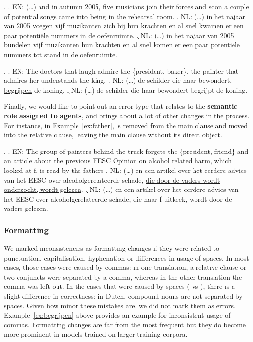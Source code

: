 \ex. \label{ex:musicians}
\a. \textsc{EN}: (\dots) and in autumn 2005, five musicians join their forces and soon a couple of potential songs came into being in the rehearsal room.
\b. \textsc{NL}: (\dots) in het najaar van 2005 voegen vijf muzikanten zich bij hun krachten en al snel kwamen er een paar potentiële nummers in de oefenruimte.
\c. \textsc{NL}: (\dots) in het najaar van 2005 bundelen vijf muzikanten hun krachten en al snel \underline{komen} er een paar potentiële nummers tot stand in de oefenruimte.


\ex. \label{ex:begrijpen}
\a. \textsc{EN}: The doctors that laugh admire the \{president, baker\}, the painter that admires her understands the king.
\b. \textsc{NL}: (\dots) de schilder die haar bewondert, \underline{begrijpen} de koning.
\c. \textsc{NL}: (\dots) de schilder die haar bewondert begrijpt de koning.

Finally, we would like to point out an error type that relates to the \textbf{semantic role assigned to agents}, and brings about a lot of other changes in the process.
For instance, in Example~\ref{ex:father},  is removed from the main clause and moved into the relative clause, leaving the main clause without its direct object.

\ex. \label{ex:father}
\a. \textsc{EN}: The group of painters behind the truck forgets the \{president, friend\} and an article about the previous EESC Opinion on alcohol related harm, which looked at f, is read by the fathers
\b. \textsc{NL}: (\dots) en een artikel over het eerdere advies van het EESC over alcoholgerelateerde schade, \underline{die door de vaders wordt onderzocht, wordt gelezen}.
\c. \textsc{NL}: (\dots) en een artikel over het eerdere advies van het EESC over alcoholgerelateerde schade, die naar f uitkeek, wordt door de vaders gelezen.

\subsubsection{Formatting}

We marked inconsistencies as formatting changes if they were related to punctuation, capitalisation, hyphenation or differences in usage of spaces. 
In most cases, those cases were caused by commas: in one translation, a relative clause or two conjuncts were separated by a comma, whereas in the other translation the comma was left out.
In the cases that were caused by spaces ( vs ), there is a slight difference in correctness: in Dutch, compound nouns are not separated by spaces. 
Given how minor these mistakes are, we did not mark them as errors.
Example~\ref{ex:begrijpen} above provides an example for inconsistent usage of commas.
Formatting changes are far from the most frequent but they do become more prominent in models trained on larger training corpora.

